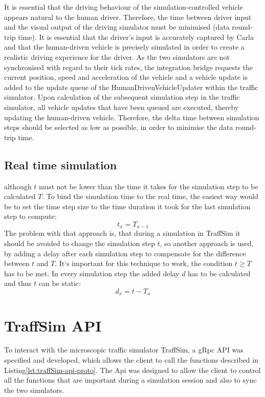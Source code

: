         It is essential that the driving behaviour of the simulation-controlled vehicle appears natural to the human driver.
        Therefore, the time between driver input and the visual output of the driving simulator must be minimised (data round-trip time).
        It is essential that the driver's input is accurately captured by Carla and that the human-driven vehicle is precisely simulated in order to create a realistic driving experience for the driver.
        As the two simulators are not synchronised with regard to their tick rates, the integration bridge requests the current position, speed and acceleration of the vehicle and a vehicle update is added to the update queue of the HumanDrivenVehicleUpdater within the traffic simulator.
        Upon calculation of the subsequent simulation step in the traffic simulator, all vehicle updates that have been queued are executed, thereby updating the human-driven vehicle.
        Therefore, the delta time between simulation steps should be selected as low as possible, in order to minimise the data round-trip time.


    \subsection{Real time simulation}\label{subsec:real-time-simulation}
        although $t$ must not be lower than the time it takes for the simulation step to be calculated $T$.
        To bind the simulation time to the real time, the easiest way would be to set the time step size to the time duration it took for the last simulation step to compute:
        \[
            t_{x} = T_{x-1}
        \]
        The problem with that approach is, that during a simulation in TraffSim it should be avoided to change the simulation step $t$, so another approach is used, by adding a delay after each simulation step to compensate for the difference between $t$ and $T$.
        It`s important for this technique to work, the condition $t \geq T$ has to be met.
        In every simulation step the added delay $d$ has to be calculated and thus $t$ can be static:
        \[
            d_{x} = t - T_x
        \]

\section{TraffSim API}\label{sec:traffsim-api}
    To interact with the microscopic traffic simulator TraffSim, a gRpc\cite{wang1993grpc} API was specified and developed, which allows the client to call the functions described in Listing\ref{lst:traffSim-api-proto}.
    The Api was designed to allow the client to control all the functions that are important during a simulation session and also to sync the two simulators.



